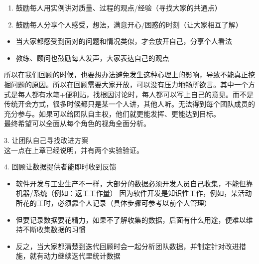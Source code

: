 \begin{enumerate}
\tightlist
\item
  鼓励每人用实例讲对质量、过程的观点/经验（寻找大家的共通点）
\item
  鼓励每人分享个人感受，想法，满意开心/困惑的时刻（让大家相互了解）
\end{enumerate}

\begin{itemize}
\tightlist
\item
  当大家都感受到面对的问题和情况类似，才会放开自己，分享个人看法
\item
  教练、顾问也鼓励每人发声，大家表达自己的观点
\end{itemize}

所以在我们回顾的时候，也要想办法避免发生这种心理上的影响，导致不能真正挖掘问题的原因。所以在回顾需要大家开放，可以没有压力地畅所欲言。其中一个方式是每人都有水笔+便利贴，找根因讨论时，每人都可以写上自己的意见。而不是传统开会方式，很多时候都只是某一个人讲，其他人听。无法得到每个团队成员的充分参与。如果可以给团队自主权，他们就更能发挥、更能达到目标。\\
最终希望可以全面从每个角色的视角全面分析。

3. 让团队自己寻找改进方案\\

这一点在上章已经说明，并有两个实验验证。

4. 回顾让数据提供者能即时收到反馈\\

\begin{itemize}
\tightlist
\item
  软件开发与工业生产不一样，大部分的数据必须开发人员自己收集，不能但靠机器/系统（例如：返工工作量） 因为软件开发是知识性工作，例如，某活动所花的工时，必须靠个人记录（具体步骤可参考以前个人管理）
\item
  但要记录数据要花精力，如果不了解收集的数据，后面有什么用途，便难以维持不断收集数据的习惯
\item
  反之，当大家都清楚到迭代回顾时会一起分析团队数据，并制定针对改进措施，就有动力继续迭代里统计数据
\end{itemize}

